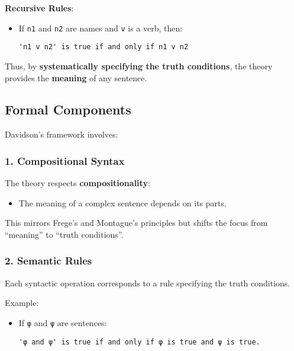 \documentclass[12pt]{article}
\newcommand{\tightlist}{\itemsep 0pt\parskip 0pt\parsep 0pt}
\begin{document}
\textbf{Recursive Rules}:

\begin{itemize}
\item
  If \texttt{n1} and \texttt{n2} are names and \texttt{v} is a verb,
  then:

\begin{verbatim}
'n1 v n2' is true if and only if n1 v n2
\end{verbatim}
\end{itemize}

Thus, by \textbf{systematically specifying the truth conditions}, the
theory provides the \textbf{meaning} of any sentence.

\hypertarget{formal-components}{%
\subsection{Formal Components}\label{formal-components}}

Davidson's framework involves:

\hypertarget{compositional-syntax}{%
\subsubsection{\texorpdfstring{1. \textbf{Compositional
Syntax}}{1. Compositional Syntax}}\label{compositional-syntax}}

The theory respects \textbf{compositionality}:

\begin{itemize}
\tightlist
\item
  The meaning of a complex sentence depends on its parts.
\end{itemize}

This mirrors Frege's and Montague's principles but shifts the focus from
``meaning'' to ``truth conditions''.

\hypertarget{semantic-rules-1}{%
\subsubsection{\texorpdfstring{2. \textbf{Semantic
Rules}}{2. Semantic Rules}}\label{semantic-rules-1}}

Each syntactic operation corresponds to a rule specifying the truth
conditions.

Example:

\begin{itemize}
\item
  If \texttt{φ} and \texttt{ψ} are sentences:

\begin{verbatim}
'φ and ψ' is true if and only if φ is true and ψ is true.
\end{verbatim}
\end{itemize}
\end{document}
